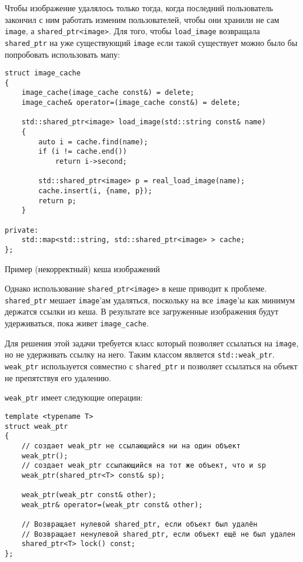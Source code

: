 Чтобы изображение удалялось только тогда, когда последний пользователь закончил с ним работать изменим пользователей, чтобы они хранили не сам \texttt{image}, а \texttt{shared_ptr<image>}. Для того, чтобы \texttt{load_image} возвращала \texttt{shared_ptr} на уже существующий \texttt{image} если такой существует можно было бы попробовать использовать мапу:

\begin{listing}
\begin{verbatim}
struct image_cache
{
    image_cache(image_cache const&) = delete;
    image_cache& operator=(image_cache const&) = delete;

    std::shared_ptr<image> load_image(std::string const& name)
    {
        auto i = cache.find(name);
        if (i != cache.end())
            return i->second;
            
        std::shared_ptr<image> p = real_load_image(name);
        cache.insert(i, {name, p});
        return p;
    }

private:
    std::map<std::string, std::shared_ptr<image> > cache;
};
\end{verbatim}
\caption{Пример (некорректный) кеша изображений}
\label{listing:shared_ptr_image_cache_broken}
\end{listing}

Однако использование \texttt{shared_ptr<image>} в кеше приводит к проблеме. \texttt{shared_ptr} мешает \texttt{image}'ам удаляться, поскольку на все \texttt{image}'ы как минимум держатся ссылки из кеша. В результате все загруженные изображения будут удерживаться, пока живет \texttt{image_cache}.

Для решения этой задачи требуется класс который позволяет ссылаться на \texttt{image}, но не удерживать ссылку на него. Таким классом является \texttt{std::weak_ptr}. \texttt{weak_ptr} используется совместно с \texttt{shared_ptr} и позволяет ссылаться на объект не препятствуя его удалению.

\texttt{weak_ptr} имеет следующие операции:

\begin{verbatim}
template <typename T>
struct weak_ptr
{
    // создает weak_ptr не ссылающийся ни на один объект
    weak_ptr();
    // создает weak_ptr ссылающийся на тот же объект, что и sp
    weak_ptr(shared_ptr<T> const& sp);

    weak_ptr(weak_ptr const& other);
    weak_ptr& operator=(weak_ptr const& other);

    // Возвращает нулевой shared_ptr, если объект был удалён
    // Возвращает ненулевой shared_ptr, если объект ещё не был удален
    shared_ptr<T> lock() const;
};
\end{verbatim}

